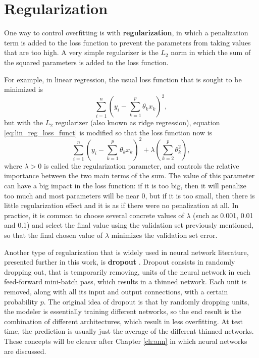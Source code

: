 \section{Regularization}

One way to control overfitting is with \textbf{regularization}, in which a penalization term is added to the loss function to prevent the parameters from taking values that are too high. A very simple regularizer is the $L_2$ norm in which the sum of the squared parameters is added to the loss function.

For example, in linear regression, the usual loss function that is sought to be minimized is
\begin{equation}
  \label{eq:lin_reg_loss_funct}
  \sum_{i = 1}^n{ \left( y_i - \sum_{k = 1}^p  \theta_k x_k \right) ^ 2},
\end{equation}
but with the $L_2$ regularizer (also known as ridge regression), equation \eqref{eq:lin_reg_loss_funct} is modified so that the loss function now is
\begin{equation}
  \label{eq:lin_reg_loss_funct_reg}
  \sum_{i = 1}^n{ \left( y_i - \sum_{k = 1}^p \theta_k x_k \right) ^ 2}
  + \lambda \left( \sum_{k = 2}^p \theta_k^2 \right),
\end{equation}
where $\lambda > 0$ is called the regularization parameter, and controls the relative importance between the two main terms of the sum. The value of this parameter can have a big impact in the loss function: if it is too big, then it will penalize too much and most parameters will be near 0, but if it is too small, then there is little regularization effect and it is as if there were no penalization at all. In practice, it is common to choose several concrete values of $\lambda$ (such as 0.001, 0.01 and 0.1) and select the final value using the validation set previously mentioned, so that the final chosen value of $\lambda$ minimizes the validation set error.

Another type of regularization that is widely used in neural network literature, presented further in this work, is \textbf{dropout} \cite{srivastava2014dropout}. Dropout consists in randomly dropping out, that is temporarily removing, units of the neural network in each feed-forward mini-batch pass, which results in a thinned network. Each unit is removed, along with all its input and output connections, with a certain probability $p$. The original idea of dropout is that by randomly dropping units, the modeler is essentially training different networks, so the end result is the combination of different architectures, which result in less overfitting. At test time, the prediction is usually just the average of the different thinned networks. These concepts will be clearer after Chapter \ref{ch:ann} in which neural networks are discussed.

